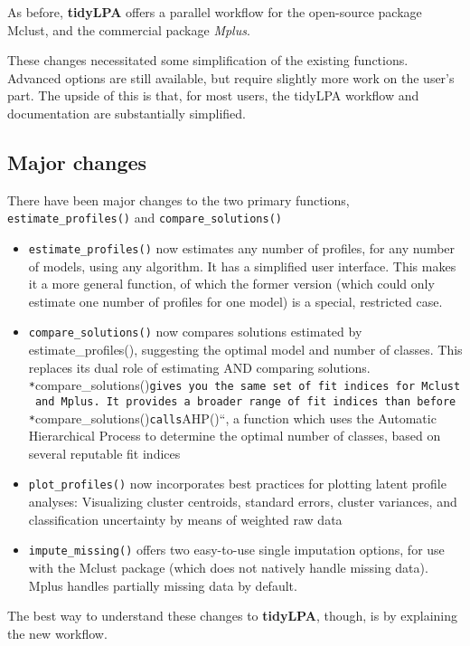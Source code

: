 \documentclass[man]{apa6}
\begin{document}
As before, \textbf{tidyLPA} offers a parallel workflow for the
open-source package Mclust, and the commercial package \emph{Mplus}.

These changes necessitated some simplification of the existing
functions. Advanced options are still available, but require slightly
more work on the user's part. The upside of this is that, for most
users, the tidyLPA workflow and documentation are substantially
simplified.

\subsection{Major changes}\label{major-changes}

There have been major changes to the two primary functions,
\texttt{estimate\_profiles()} and \texttt{compare\_solutions()}

\begin{itemize}
\item
  \texttt{estimate\_profiles()} now estimates any number of profiles,
  for any number of models, using any algorithm. It has a simplified
  user interface. This makes it a more general function, of which the
  former version (which could only estimate one number of profiles for
  one model) is a special, restricted case.
\item
  \texttt{compare\_solutions()} now compares solutions estimated by
  estimate\_profiles(), suggesting the optimal model and number of
  classes. This replaces its dual role of estimating AND comparing
  solutions.
  \texttt{*}compare\_solutions()\texttt{gives\ you\ the\ same\ set\ of\ fit\ indices\ for\ Mclust\ and\ Mplus.\ It\ provides\ a\ broader\ range\ of\ fit\ indices\ than\ before\ *}compare\_solutions()\texttt{calls}AHP()``,
  a function which uses the Automatic Hierarchical Process to determine
  the optimal number of classes, based on several reputable fit indices
\item
  \texttt{plot\_profiles()} now incorporates best practices for plotting
  latent profile analyses: Visualizing cluster centroids, standard
  errors, cluster variances, and classification uncertainty by means of
  weighted raw data
\item
  \texttt{impute\_missing()} offers two easy-to-use single imputation
  options, for use with the Mclust package (which does not natively
  handle missing data). Mplus handles partially missing data by default.
\end{itemize}

The best way to understand these changes to \textbf{tidyLPA}, though, is
by explaining the new workflow.
\end{document}
